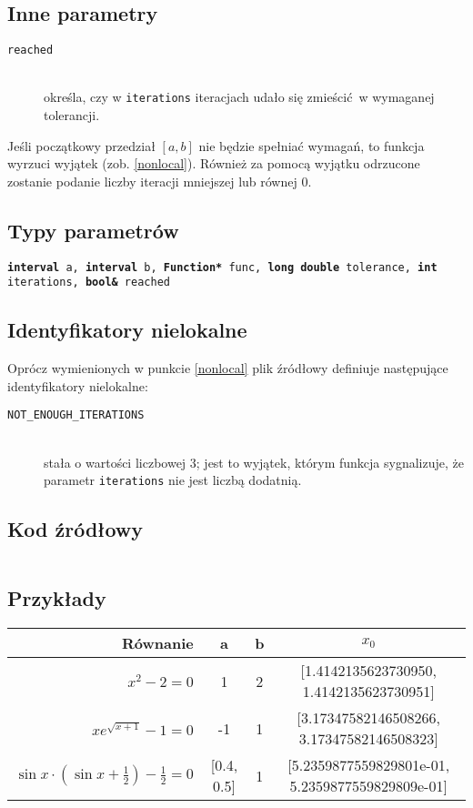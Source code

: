 \documentclass[12pt]{article}
\begin{document}
		\subsection{Inne parametry}
			\begin{description}
				\item[\texttt{reached}] \hfill\\ określa, czy w \texttt{iterations} iteracjach udało się zmieścić w wymaganej tolerancji.
			\end{description}

      Jeśli początkowy przedział $[a, b]$ nie będzie spełniać wymagań, to funkcja wyrzuci wyjątek (zob. \ref{nonlocal}).
      Również za pomocą wyjątku odrzucone zostanie podanie liczby iteracji mniejszej lub równej 0.

		\subsection{Typy parametrów}
			\texttt{\textbf{interval} a, \textbf{interval} b, \textbf{Function*} func, \textbf{long double} tolerance, \textbf{int} iterations, \textbf{bool\&} reached}

		\subsection{Identyfikatory nielokalne}
      Oprócz wymienionych w punkcie \ref{nonlocal} plik źródłowy definiuje następujące identyfikatory nielokalne:

      \begin{description}
				\item[\texttt{NOT\_ENOUGH\_ITERATIONS}] \hfill\\
					stała o wartości liczbowej 3; jest to wyjątek, którym funkcja sygnalizuje, że parametr \texttt{iterations} nie jest liczbą dodatnią.
			\end{description}

		\subsection{Kod źródłowy}
		  \inputminted[firstline=3, lastline=41]{c++}{../solvers/bisection.cpp}

		\subsection{Przykłady}
			\begin{tabular}{|r|c|c||c|}
				\hline
				Równanie & a & b & $x_0$ \\\hline

				$x^2 - 2 = 0$ & 1 & 2 & [1.4142135623730950, 1.4142135623730951] \\\hline
				$xe^{\sqrt{x+1}} - 1 = 0$ & -1 & 1 & [3.17347582146508266, 3.17347582146508323] \\\hline
				$\sin{x} \cdot (\sin{x} + \frac{1}{2}) - \frac{1}{2} = 0$ & [0.4, 0.5] & 1 & [5.2359877559829801e-01, 5.2359877559829809e-01] \\\hline

			\end{tabular}
\end{document}
